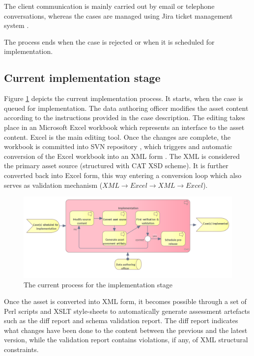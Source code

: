 	The client communication is mainly carried out by email or telephone conversations, whereas the cases are managed using Jira ticket management system \citep{jira}. 
	
	The process ends when the case is rejected or when it is scheduled for implementation. 

	
	\subsection{Current implementation stage}
	\label{sec:implementation-current}
		
	Figure \ref{fig:implementation-current} depicts the current implementation process. It starts, when the case is queued for implementation. The data authoring officer modifies the asset content according to the instructions provided in the case description. The editing takes place in an Microsoft Excel \citep{excel} workbook which represents an interface to the asset content. Excel is the main editing tool. Once the changes are complete, the workbook is committed into SVN repository \citep{svn}, which triggers and automatic conversion of the Excel workbook into an XML form \cite{xml11-spec}. The XML is considered the primary asset source (structured with CAT XSD scheme). It is further converted back into Excel form, this way entering a conversion loop which also serves as validation mechanism ($XML \rightarrow Excel \rightarrow XML \rightarrow Excel$).
	
	\begin{figure}[h]
		\centering
		\includegraphics[width=.9\textwidth]{images/business/current/Implementation.png}
		\caption{The current process for the implementation stage}
		\label{fig:implementation-current}
	\end{figure}
	
	Once the asset is converted into XML form, it becomes possible through a set of Perl scripts and XSLT style-sheets \citep{xslt3-Kay} to automatically generate assessment artefacts such as the diff report and schema validation report. The diff report indicates what changes have been done to the content between the previous and the latest version, while the validation report contains violations, if any, of XML structural constraints.
	
